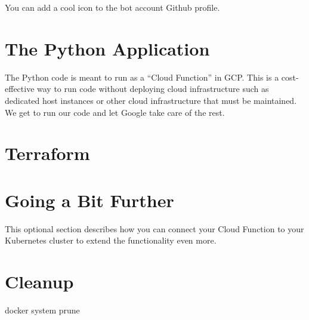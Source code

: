 \justifying
You can add a cool icon to the bot account Github profile.


\section{\label{sec:Python} The Python Application}

\justifying
The Python code is meant to run as a ``Cloud Function'' in GCP. This is a cost-effective way to run code
without deploying cloud infrastructure such as dedicated host instances or other cloud infrastructure
that must be maintained. We get to run our code and let Google take care of the rest.

\section{\label{sec:Terraform}Terraform}

\section{\label{sec:next}Going a Bit Further}

\justifying
This optional section describes how you can connect your Cloud Function to your Kubernetes cluster to extend the functionality even more.

\section{\label{sec:cleanup}Cleanup}

\justifying

docker system prune


\clearpage
\begin{versionhistory}
\end{versionhistory}

\clearpage





